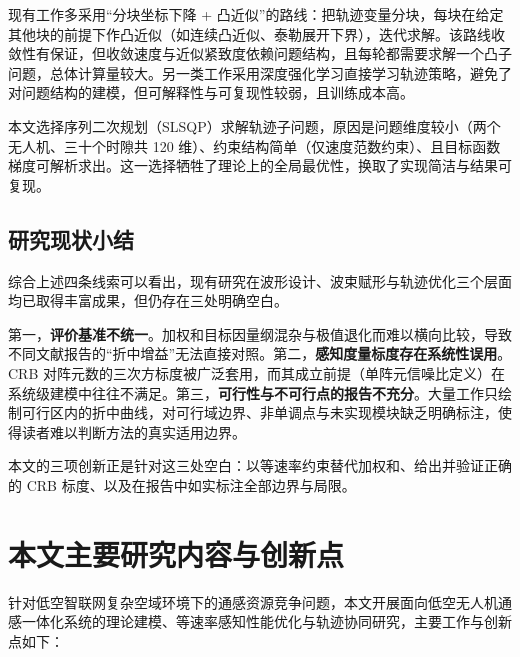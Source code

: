 现有工作多采用“分块坐标下降 + 凸近似”的路线：把轨迹变量分块，每块在给定其他块的前提下作凸近似（如连续凸近似、泰勒展开下界），迭代求解。该路线收敛性有保证，但收敛速度与近似紧致度依赖问题结构，且每轮都需要求解一个凸子问题，总体计算量较大。另一类工作采用深度强化学习直接学习轨迹策略，避免了对问题结构的建模，但可解释性与可复现性较弱，且训练成本高。

本文选择序列二次规划（SLSQP）求解轨迹子问题，原因是问题维度较小（两个无人机、三十个时隙共 120 维）、约束结构简单（仅速度范数约束）、且目标函数梯度可解析求出。这一选择牺牲了理论上的全局最优性，换取了实现简洁与结果可复现。

\subsection{研究现状小结}
综合上述四条线索可以看出，现有研究在波形设计、波束赋形与轨迹优化三个层面均已取得丰富成果，但仍存在三处明确空白。

第一，\textbf{评价基准不统一}。加权和目标因量纲混杂与极值退化而难以横向比较，导致不同文献报告的“折中增益”无法直接对照。第二，\textbf{感知度量标度存在系统性误用}。CRB 对阵元数的三次方标度被广泛套用，而其成立前提（单阵元信噪比定义）在系统级建模中往往不满足。第三，\textbf{可行性与不可行点的报告不充分}。大量工作只绘制可行区内的折中曲线，对可行域边界、非单调点与未实现模块缺乏明确标注，使得读者难以判断方法的真实适用边界。

本文的三项创新正是针对这三处空白：以等速率约束替代加权和、给出并验证正确的 CRB 标度、以及在报告中如实标注全部边界与局限。

\section{本文主要研究内容与创新点}
\label{sec:contribution}

针对低空智联网复杂空域环境下的通感资源竞争问题，本文开展面向低空无人机通感一体化系统的理论建模、等速率感知性能优化与轨迹协同研究，主要工作与创新点如下：

